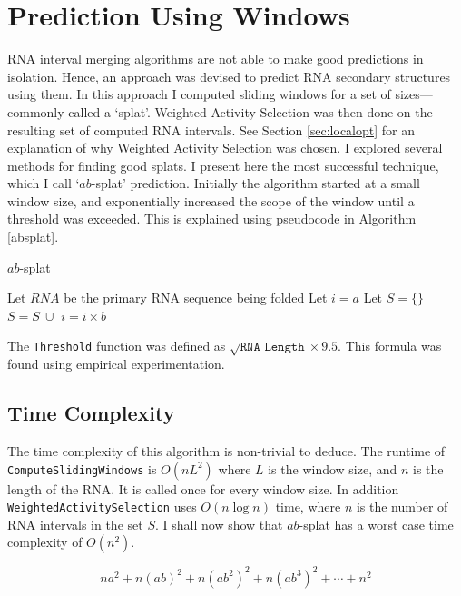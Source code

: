 \documentclass{cshonours}
\begin{document}
\section{Prediction Using Windows}
\label{sec:absplat}
RNA interval merging algorithms are not able to make good predictions in isolation. Hence, an approach was devised to predict RNA secondary structures using them. In this approach I computed sliding windows for a set of sizes---commonly called a `splat'. Weighted Activity Selection was then done on the resulting set of computed RNA intervals. See Section \ref{sec:localopt} for an explanation of why Weighted Activity Selection was chosen. I explored several methods for finding good splats. I present here the most successful technique, which I call `$ab$-splat' prediction. Initially the algorithm started at a small window size, and exponentially increased the scope of the window until a threshold was exceeded. This is explained using pseudocode in Algorithm \ref{absplat}.

\begin{algorithm}
  \caption{$ab$-splat}
  \label{absplat}
  \begin{algorithmic}[1]
  \State Let $RNA$ be the primary RNA sequence being folded
  \State Let $i = a$
  \State Let $S = \{\}$
  	\State $S = S \: \cup $ 
  	\State $i = i \times b$
  \EndWhile
  \State \Return {}
  \end{algorithmic}
\end{algorithm}

The \texttt{Threshold} function was defined as $\sqrt{ \texttt{RNA Length} } \times 9.5$. This formula was found using empirical experimentation.

\subsection{Time Complexity}

The time complexity of this algorithm is non-trivial to deduce. The runtime of \texttt{ComputeSlidingWindows} is $O(nL^2)$ where $L$ is the window size, and $n$ is the length of the RNA. It is called once for every window size. In addition \texttt{WeightedActivitySelection} uses $O(n \log n)$ time, where $n$ is the number of RNA intervals in the set $S$. I shall now show that $ab$-splat has a worst case time complexity of $O(n^2)$.

\begin{equation} \label{eq:abtimeone}
	n a^2 + n(a b)^2 + n(a b^2)^2 + n(a b^3)^2 + \cdots + n^2
\end{equation}
\end{document}
